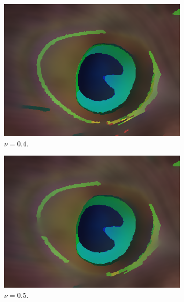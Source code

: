 \documentclass[abstracton]{scrreprt}
\begin{document}
\begin{figure}[!ht]
\begin{subfigure}[b]{0.16\textwidth}
                    \includegraphics[width=\textwidth]{img/segmentation/rt/04peacock-feather.png}
                    \caption{$\nu = 0.4$.}
                \end{subfigure}
                \begin{subfigure}[b]{0.16\textwidth}
                    \includegraphics[width=\textwidth]{img/segmentation/rt/05peacock-feather.png}
                    \caption{$\nu = 0.5$.}
                \end{subfigure}
                \begin{subfigure}[b]{0.16\textwidth}

\end{subfigure}
\end{figure}
\end{document}
